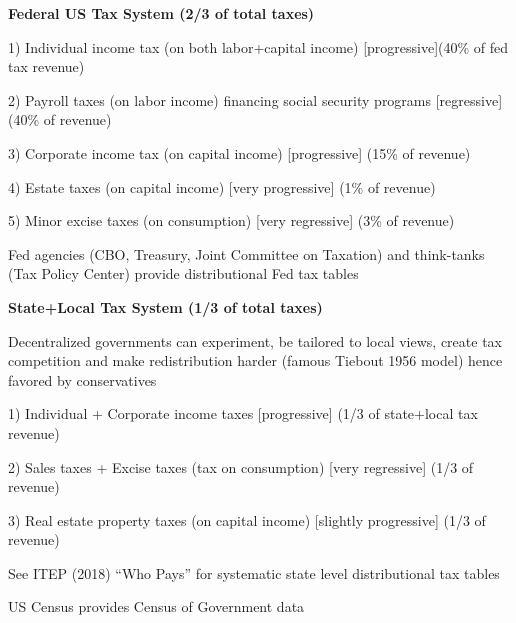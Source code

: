 \documentclass[landscape]{slides}
\begin{document}
%



\begin{slide}

\end{slide}

\begin{slide}

\end{slide}



\begin{slide}
\begin{center}
{\bf Federal US Tax System (2/3 of total taxes)}
\end{center}
1) Individual income tax (on both labor+capital income)
[progressive](40\% of fed tax revenue)

2) Payroll taxes (on labor income) financing social security programs [regressive] (40\% of revenue)

3) Corporate income tax (on capital income) [progressive] (15\% of revenue)

4) Estate taxes (on capital income) [very progressive] (1\% of
revenue)

5) Minor excise taxes (on consumption) [very regressive] (3\%
of revenue)

Fed agencies (CBO, Treasury, Joint Committee on Taxation) and think-tanks (Tax Policy Center)
provide distributional Fed tax tables

\end{slide}


\begin{slide}
\begin{center}
{\bf State+Local Tax System (1/3 of total taxes)}
\end{center}
Decentralized governments can experiment, be tailored to local views, create tax competition and make redistribution harder (famous Tiebout 1956 model)
hence favored by conservatives

1) Individual + Corporate income taxes
[progressive] (1/3 of state+local tax revenue)

2) Sales taxes + Excise taxes (tax on consumption) [very regressive] (1/3 of
revenue)

3) Real estate property taxes (on capital income)
[slightly progressive] (1/3 of revenue)

See ITEP (2018) ``Who Pays'' for systematic state level distributional tax tables

US Census provides Census of Government data


\end{slide}
\end{document}
